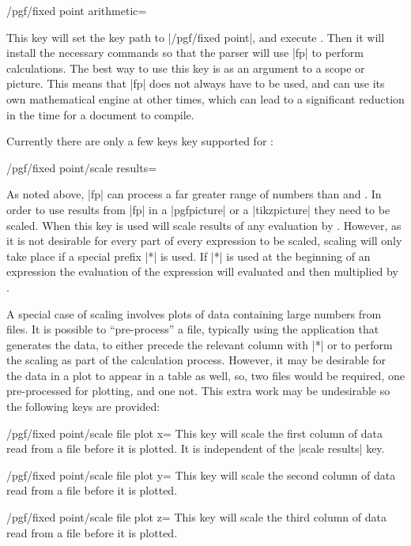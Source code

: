 \begin{key}{/pgf/fixed point arithmetic=}

  This key will set the key path to |/pgf/fixed point|, and 
  execute . Then it will install the necessary 
  commands so that the \pgfname{} parser will use |fp| to perform 
  calculations. 
  The best way to use this key is as an argument to a scope or 
  picture. This means that |fp| does not always have to be used, 
  and \pgfname{} can use its own mathematical engine at other times, 
  which can lead to a significant reduction in the time for a document 
  to compile.
  
\end{key}

  Currently there are only a few keys key supported for :
  
\begin{key}{/pgf/fixed point/scale results=}

	As noted above, |fp| can process a far greater range of numbers
	than \pgfname{} and \tikzname{}. In order to use results from 
	|fp| in a |{pgfpicture}| or a |{tikzpicture}| they need to be
	scaled. When this key is used \pgfname{} will scale results
	of any evaluation by . However, as it is not
	desirable for every part of every expression to be scaled,
	scaling will only take place if a special prefix |*| is used.
	If |*| is used at the beginning of an expression the evaluation
	of the expression will evaluated and then multiplied by 
	.

  
  A special case of scaling involves plots of data containing
  large numbers from files.
  It is possible to ``pre-process'' a file, typically using the 
  application that generates the data, to either precede
  the relevant column with |*| or to perform the scaling as part
  of the calculation process. However, it may be desirable for
  the data in a plot to appear in a table as well, so, two files would
  be required, one pre-processed for plotting, and one not. This
  extra work may be undesirable so the following keys are provided:
  
\begin{key}{/pgf/fixed point/scale file plot x=}
  This key will scale the first column of data read from
  a file before it is plotted. It is independent of the
  |scale results| key.
\end{key}

\begin{key}{/pgf/fixed point/scale file plot y=}
  This key will scale the second column of data read from
  a file before it is plotted. 
\end{key}

\begin{key}{/pgf/fixed point/scale file plot z=}
  This key will scale the third column of data read from
  a file before it is plotted. 
\end{key}

\end{key} 

